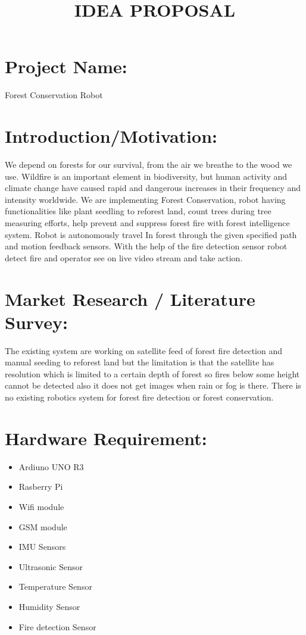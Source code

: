 \documentclass{report}
\title{IDEA PROPOSAL}
\begin{document}
 \maketitle
\section{Project Name:}
Forest Conservation Robot
 	
\section{Introduction/Motivation:}
We depend on forests for our survival, from the air we breathe to the wood we use. Wildfire is an important element in biodiversity, but human activity and climate change have caused rapid and dangerous increases in their frequency and intensity worldwide. We are implementing Forest Conservation, robot having functionalities like plant seedling to reforest land, count trees during tree measuring efforts, help prevent and suppress forest fire with forest intelligence system. Robot is autonomously travel In forest through the given specified path and motion feedback sensors. With the help of the fire detection sensor robot detect fire and operator see on live video stream and take action.

\section{Market Research / Literature Survey:}
The existing system are working on satellite feed of forest fire detection and manual seeding to reforest land but the limitation is that the satellite has resolution which is limited to a certain depth of forest so fires below some height cannot be detected also it does not get images when rain or fog is there.
There is no existing robotics system for forest fire detection or forest conservation.

\section{Hardware Requirement:}
\begin{itemize}
	\item Ardiuno UNO R3 
	\item Rasberry Pi
	\item Wifi module
	\item GSM module
	\item IMU Sensors
	\item Ultrasonic Sensor
	\item Temperature Sensor
	\item Humidity Sensor
	\item Fire detection Sensor
\end{itemize}
\end{document}
